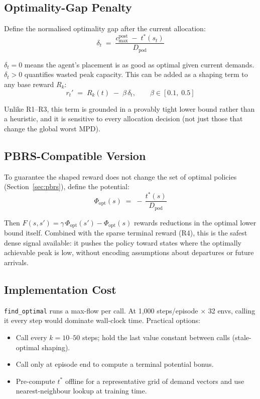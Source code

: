 \documentclass[11pt]{article}
\begin{document}
\subsection{Optimality-Gap Penalty}

Define the normalised optimality gap after the current allocation:
\begin{equation}
\boxed{
  \delta_t
  \;=\;
  \frac{c_{\max}^{\text{post}} \;-\; t^*(s_t)}{D_{\text{pod}}}
}
\label{eq:optgap}
\end{equation}

$\delta_t = 0$ means the agent's placement is as good as optimal given
current demands.  $\delta_t > 0$ quantifies wasted peak capacity.
This can be added as a shaping term to any base reward $R_k$:
\begin{equation}
  r_t'
  \;=\;
  R_k(t) \;-\; \beta\,\delta_t,
  \qquad
  \beta \in [0.1,\; 0.5]
  \label{eq:optgap-shaped}
\end{equation}

Unlike R1--R3, this term is grounded in a provably tight lower bound
rather than a heuristic, and it is sensitive to every allocation decision
(not just those that change the global worst MPD).

\subsection{PBRS-Compatible Version}

To guarantee the shaped reward does not change the set of optimal policies
(Section~\ref{sec:pbrs}), define the potential:
\begin{equation}
  \Phi_{\text{opt}}(s)
  \;=\;
  -\,\frac{t^*(s)}{D_{\text{pod}}}
  \label{eq:opt-potential}
\end{equation}

Then $F(s,s') = \gamma\,\Phi_{\text{opt}}(s') - \Phi_{\text{opt}}(s)$
rewards reductions in the optimal lower bound itself.  Combined with the
sparse terminal reward (R4), this is the safest dense signal available:
it pushes the policy toward states where the optimally achievable peak is
low, without encoding assumptions about departures or future arrivals.

\subsection{Implementation Cost}

\texttt{find\_optimal} runs a max-flow per call.  At 1{,}000
steps/episode $\times$ 32 envs, calling it every step would dominate
wall-clock time.  Practical options:
\begin{itemize}
  \item Call every $k = 10$--$50$ steps; hold the last value constant
        between calls (stale-optimal shaping).
  \item Call only at episode end to compute a terminal potential bonus.
  \item Pre-compute $t^*$ offline for a representative grid of demand
        vectors and use nearest-neighbour lookup at training time.
\end{itemize}
\end{document}
